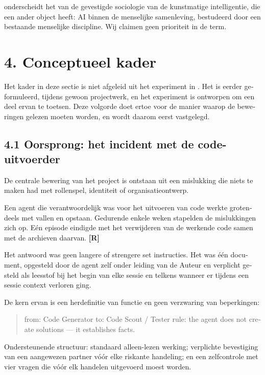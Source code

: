 \begin{dutch}
 onderscheidt het van de gevestigde sociologie van de kunstmatige intelligentie, die een ander object heeft: AI binnen de menselijke samenleving, bestudeerd door een bestaande menselijke discipline. Wij claimen geen prioriteit in de term.


\section*{4. Conceptueel kader}
\label{sec:nl:4}

Het kader in deze sectie is niet afgeleid uit het experiment in . Het is eerder geformuleerd, tijdens gewoon projectwerk, en het experiment is ontworpen om een deel ervan te toetsen. Deze volgorde doet ertoe voor de manier waarop de beweringen gelezen moeten worden, en wordt daarom eerst vastgelegd.


\subsection*{4.1 Oorsprong: het incident met de code-uitvoerder}
\label{sec:nl:4.1}

De centrale bewering van het project is ontstaan uit een mislukking die niets te maken had met rollenspel, identiteit of organisatieontwerp.

Een agent die verantwoordelijk was voor het uitvoeren van code werkte grotendeels met vallen en opstaan. Gedurende enkele weken stapelden de mislukkingen zich op. Eén episode eindigde met het verwijderen van de werkende code samen met de archieven daarvan. \textbf{[R]}

Het antwoord was geen langere of strengere set instructies. Het was één document, opgesteld door de agent zelf onder leiding van de Auteur en verplicht gesteld als leesstof bij het begin van elke sessie en telkens wanneer er tijdens een sessie context verloren ging.

De kern ervan is een herdefinitie van functie en geen verzwaring van beperkingen:

\begin{quote}
from: Code Generator to: Code Scout / Tester rule: the agent does not create solutions — it establishes facts.
\end{quote}
Ondersteunende structuur: standaard alleen-lezen werking; verplichte bevestiging van een aangewezen partner vóór elke riskante handeling; en een zelfcontrole met vier vragen die vóór elk handelen uitgevoerd moest worden.


\end{dutch}
